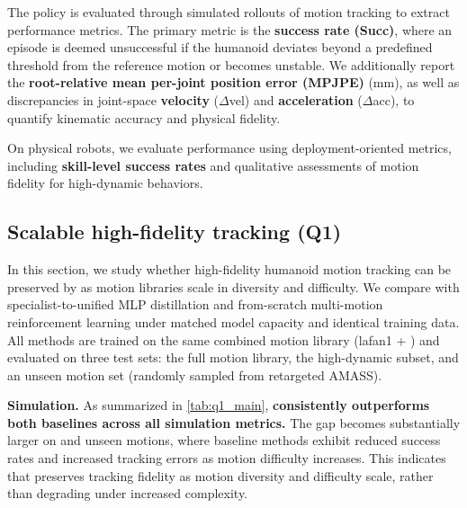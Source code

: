 The policy is evaluated through simulated rollouts of motion tracking to extract performance metrics. The primary metric is the \textbf{success rate (Succ)}, where an episode is deemed
unsuccessful if the humanoid deviates beyond a predefined threshold from the reference
motion or becomes unstable.
We additionally report the \textbf{root-relative mean per-joint position error (MPJPE)}
(mm), as well as discrepancies in joint-space \textbf{velocity} ($\Delta$vel) and
\textbf{acceleration} ($\Delta$acc), to quantify kinematic accuracy and physical fidelity.

On physical robots, we evaluate performance using deployment-oriented metrics, including \textbf{skill-level
success rates} and
qualitative assessments of motion fidelity for high-dynamic behaviors.


\subsection{Scalable high-fidelity tracking (Q1)}
\label{sec:q1_main}


In this section, we study whether high-fidelity humanoid motion tracking can be
preserved by \model as motion libraries scale in diversity and difficulty.
We compare \model with specialist-to-unified MLP distillation and from-scratch
multi-motion reinforcement learning under matched model capacity and identical
training data.
All methods are trained on the same combined motion library
(\ac{lafan1} + \dataset) and evaluated on three test sets:
the full motion library, the high-dynamic \dataset subset, and an unseen motion set
(randomly sampled from retargeted AMASS).

\textbf{Simulation.}
As summarized in \cref{tab:q1_main}, \textbf{\model consistently outperforms both baselines
across all simulation metrics.} The gap becomes substantially larger
on \dataset and unseen motions, where baseline methods exhibit reduced success rates
and increased tracking errors as motion difficulty increases. This indicates that \model preserves tracking fidelity as motion diversity and
difficulty scale, rather than degrading under increased complexity.

